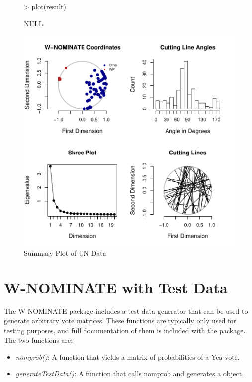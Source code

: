 \documentclass[12pt]{article}
\begin{document}
\begin{figure}
\begin{center}
\begin{Schunk}
\begin{Sinput}
> plot(result)
\end{Sinput}
\begin{Soutput}
NULL
\end{Soutput}
\end{Schunk}
\includegraphics{wnominate-UN4}
\end{center}
\caption{Summary Plot of UN Data}
\label{fig:three}
\end{figure}

\section{W-NOMINATE with Test Data}

The W-NOMINATE package includes a test data generator that can be
used to generate arbitrary vote matrices.  These functions are
typically only used for testing purposes, and full documentation
of them is included with the package.  The two functions are:

\begin{itemize}
\item \emph{nomprob()}: A function that yields a matrix of
probabilities of a Yea vote.
\item \emph{generateTestData()}: A function that calls nomprob and
generates a \verb@rollcall@ object.
\end{itemize}
\end{document}
